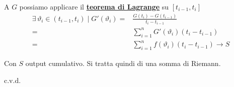 \documentclass[../../analisi1]{subfiles}
\begin{document}
                A \(G\) possiamo applicare il \textbf{\hyperref[teoLagrange]{teorema di Lagrange}} su \([t_{i-1}, t_i]\)
                \begin{align*}
                    \exists \, \vartheta_i \in (t_{i-1}, t_i) \mid G'(\vartheta_i) =& \frac{G(t_i) - G(t_{i-1})}{t_i - t_{i-1}} \\
                    =& \sum_{i=1}^{n} G'(\vartheta_i)(t_i - t_{i-1}) \\
                    =& \sum_{i=1}^{n} f(\vartheta_i)(t_i - t_{i-1}) \longrightarrow S
                \end{align*}

                Con \(S\) output cumulativo. Si tratta quindi di una somma di Riemann.

                \medskip
                
                c.v.d.
    
\end{document}
